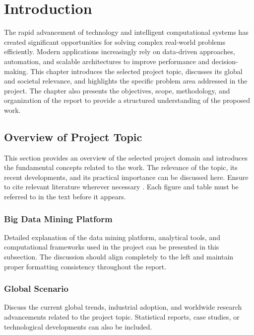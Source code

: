 \chapter{Introduction}

The rapid advancement of technology and intelligent computational systems has created significant opportunities for solving complex real-world problems efficiently. Modern applications increasingly rely on data-driven approaches, automation, and scalable architectures to improve performance and decision-making. This chapter introduces the selected project topic, discusses its global and societal relevance, and highlights the specific problem area addressed in the project. The chapter also presents the objectives, scope, methodology, and organization of the report to provide a structured understanding of the proposed work.


\section{Overview of Project Topic}

This section provides an overview of the selected project domain and introduces the fundamental concepts related to the work. The relevance of the topic, its recent developments, and its practical importance can be discussed here. Ensure to cite relevant literature wherever necessary \cite{Razavi2000}. Each figure and table must be referred to in the text before it appears.

\subsection{Big Data Mining Platform}

Detailed explanation of the data mining platform, analytical tools, and computational frameworks used in the project can be presented in this subsection. The discussion should align completely to the left and maintain proper formatting consistency throughout the report.

\subsection{Global Scenario}

Discuss the current global trends, industrial adoption, and worldwide research advancements related to the project topic. Statistical reports, case studies, or technological developments can also be included.


